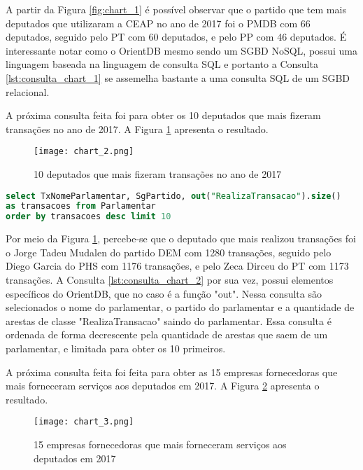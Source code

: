 A partir da Figura \ref{fig:chart_1} é possível observar que o partido que tem mais deputados que utilizaram a CEAP no ano de 2017 foi o PMDB com 66 deputados, seguido pelo PT com 60 deputados, e pelo PP com 46 deputados. É interessante notar como o OrientDB mesmo sendo um SGBD NoSQL, possui uma linguagem baseada na linguagem de consulta SQL e portanto a Consulta \ref{lst:consulta_chart_1} se assemelha bastante a uma consulta SQL de um SGBD relacional.

A próxima consulta feita foi para obter os 10 deputados que mais fizeram transações no ano de 2017. A Figura \ref{fig:chart_2} apresenta o resultado.

\begin{figure}[H]
\centering
\texttt{[image: chart\_2.png]}
\caption{10 deputados que mais fizeram transações no ano de 2017}
\label{fig:chart_2}
\end{figure}

\begin{lstlisting}[label={lst:consulta_chart_2}, caption={Consulta para o gráfico \ref{fig:chart_2}},captionpos=b, language=sql]
select TxNomeParlamentar, SgPartido, out("RealizaTransacao").size() 
as transacoes from Parlamentar 
order by transacoes desc limit 10
\end{lstlisting}

Por meio da Figura \ref{fig:chart_2}, percebe-se que o deputado que mais realizou transações foi o Jorge Tadeu Mudalen do partido DEM com 1280 transações, seguido pelo Diego Garcia do PHS com 1176 transações, e pelo Zeca Dirceu do PT com 1173 transações. A Consulta \ref{lst:consulta_chart_2} por sua vez, possui elementos específicos do OrientDB, que no caso é a função "out". Nessa consulta são selecionados o nome do parlamentar, o partido do parlamentar e a quantidade de arestas de classe "RealizaTransacao" saindo do parlamentar. Essa consulta é ordenada de forma decrescente pela quantidade de arestas que saem de um parlamentar, e limitada para obter os 10 primeiros.

A próxima consulta feita foi feita para obter as 15 empresas fornecedoras que mais forneceram serviços aos deputados em 2017. A Figura \ref{fig:chart_3} apresenta o resultado.

\begin{figure}[H]
\centering
\texttt{[image: chart\_3.png]}
\caption{15 empresas fornecedoras que mais forneceram serviços aos deputados em 2017}
\label{fig:chart_3}
\end{figure}

